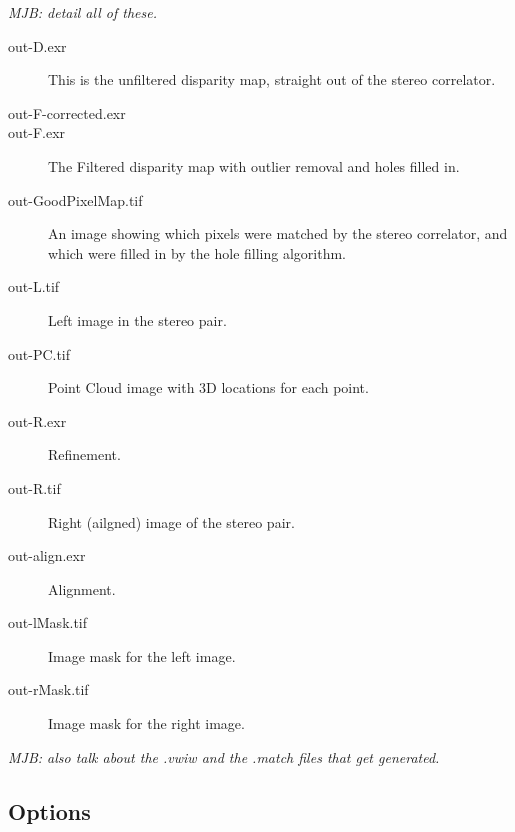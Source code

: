 \emph{MJB: detail all of these.}

\begin{description}

\item[out-D.exr] 
This is the unfiltered disparity map, straight out of the stereo correlator.

\item[out-F-corrected.exr]

\item[out-F.exr]
The Filtered disparity map with outlier removal and holes filled in.

\item[out-GoodPixelMap.tif]
An image showing which pixels were matched by the stereo correlator,
and which were filled in by the hole filling algorithm.

\item[out-L.tif]
Left image in the stereo pair.

\item[out-PC.tif]
Point Cloud image with 3D locations for each point.

\item[out-R.exr] Refinement.

\item[out-R.tif]
Right (ailgned) image of the stereo pair.

\item[out-align.exr] Alignment.
\item[out-lMask.tif] Image mask for the left image.
\item[out-rMask.tif] Image mask for the right image.

\end{description}

\emph{MJB: also talk about the .vwiw and the .match files that get generated.}


\subsection{Options}

